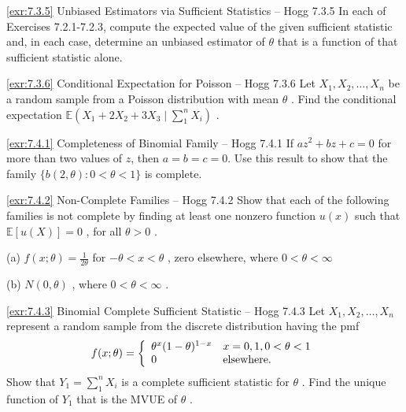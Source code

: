 \begin{exercise}{\ref{exr:7.3.5} Unbiased Estimators via Sufficient Statistics – Hogg 7.3.5}\label{exr:7.3.5}
In each of Exercises 7.2.1-7.2.3, compute the expected value of the given sufficient statistic and, in each case, determine an unbiased estimator of $\theta$ that is a function of that sufficient statistic alone.
\end{exercise}

\begin{exercise}{\ref{exr:7.3.6} Conditional Expectation for Poisson – Hogg 7.3.6}\label{exr:7.3.6}
Let $X_{1}, X_{2}, \ldots, X_{n}$ be a random sample from a Poisson distribution with mean $\theta$ . Find the conditional expectation $\mathbb{E}(X_{1} + 2X_{2} + 3X_{3} \mid \sum_{1}^{n} X_{i})$ .
\end{exercise}

\begin{exercise}{\ref{exr:7.4.1} Completeness of Binomial Family – Hogg 7.4.1}\label{exr:7.4.1}
If $az^{2} + bz + c = 0$ for more than two values of $z$, then $a = b = c = 0$. Use this result to show that the family $\{b(2, \theta): 0 < \theta < 1\}$ is complete.
\end{exercise}

\begin{exercise}{\ref{exr:7.4.2} Non-Complete Families – Hogg 7.4.2}\label{exr:7.4.2}
Show that each of the following families is not complete by finding at least one nonzero function $u(x)$ such that $\mathbb{E}[u(X)] = 0$ , for all $\theta > 0$ .

(a) $f(x; \theta) = \frac{1}{2\theta}$ for $-\theta < x < \theta$ , zero elsewhere, where $0 < \theta < \infty$

(b) $N(0,\theta)$ , where $0 < \theta < \infty$ .
\end{exercise}

\begin{exercise}{\ref{exr:7.4.3} Binomial Complete Sufficient Statistic – Hogg 7.4.3}\label{exr:7.4.3}
Let $X_{1}, X_{2}, \ldots, X_{n}$ represent a random sample from the discrete distribution having the pmf
\[
f(x; \theta) = \left\{ \begin{array}{l l} \theta^{x} (1 - \theta)^{1 - x} & x = 0, 1, 0 < \theta < 1 \\ 0 & \text{elsewhere.} \end{array} \right.
\]
Show that $Y_{1} = \sum_{1}^{n}X_{i}$ is a complete sufficient statistic for $\theta$ . Find the unique function of $Y_{1}$ that is the MVUE of $\theta$ .
\end{exercise}

